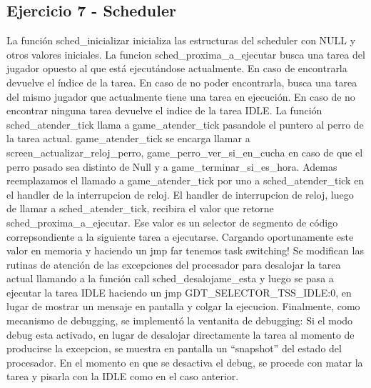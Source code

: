 \documentclass[10pt,a4paper,spanish]{article}
\begin{document}
\subsection{Ejercicio 7 - Scheduler}
La función  sched_inicializar inicializa las estructuras del scheduler con NULL y otros valores iniciales.
La funcion sched_proxima_a_ejecutar busca una tarea del jugador opuesto al que está ejecutándose actualmente. En caso de encontrarla devuelve el índice de la tarea. En caso de no poder encontrarla, busca una tarea del mismo jugador que actualmente tiene una tarea en ejecución. En caso de no encontrar ninguna tarea devuelve el indice de la tarea IDLE.
La función sched_atender_tick llama a game_atender_tick pasandole el puntero al perro de la tarea actual. game_atender_tick se encarga llamar a screen_actualizar_reloj_perro, game_perro_ver_si_en_cucha en caso de que el perro pasado sea distinto de Null y a game_terminar_si_es_hora.
Ademas reemplazamos el llamado a game_atender_tick por uno a sched_atender_tick en el handler de la interrupcion de reloj.
El handler de interrupcion de reloj, luego de llamar a sched_atender_tick, recibira el valor que retorne sched_proxima_a_ejecutar. Ese valor es un selector de segmento de código correpsondiente a la siguiente tarea a ejecutarse. Cargando oportunamente este valor en memoria y haciendo un jmp far tenemos task switching!
Se modifican las rutinas de atención de las excepciones del procesador para desalojar la tarea actual llamando a la función call sched_desalojame_esta y luego se pasa a ejecutar la tarea IDLE haciendo un jmp GDT_SELECTOR_TSS_IDLE:0, en lugar de mostrar un mensaje en pantalla y colgar la ejecucion.
Finalmente, como mecanismo de debugging, se implementó la ventanita de debugging: Si el modo debug esta activado, en lugar de desalojar directamente la tarea al momento de producirse la excepcion, se muestra en pantalla un “snapshot” del estado del procesador. En el momento en que se desactiva el debug, se procede con matar la tarea y pisarla con la IDLE como en el caso anterior.






\end{document}
